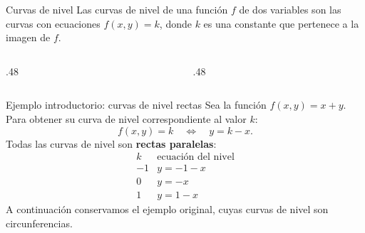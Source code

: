 \documentclass[main.tex]{subfiles}
\begin{document}
\begin{frame}{Curvas de nivel}
Las curvas de nivel de una función $f$ de dos variables son las curvas con ecuaciones $f(x,y)=k$, donde $k$ es una constante que pertenece a la imagen de $f$.
\begin{columns}[c]
\begin{column}{.48\textwidth}\end{column}
\begin{column}{.48\textwidth}\end{column}
\end{columns}
\end{frame}
\begin{frame}{Ejemplo introductorio: curvas de nivel rectas}
Sea la función $f(x,y)=x+y$.
Para obtener su curva de nivel correspondiente al valor $k$:
\[
f(x,y)=k\quad\Longleftrightarrow\quad y=k-x.
\]
\medskip
Todas las curvas de nivel son \textbf{rectas paralelas}:
\[
\begin{array}{c|c}
k&\text{ecuación del nivel}\\\hline
-1&y=-1-x\\
0&y=-x\\
1&y=1-x
\end{array}
\]
\medskip
A continuación conservamos el ejemplo original, cuyas curvas
de nivel son circunferencias.
\end{frame}
\end{document}
